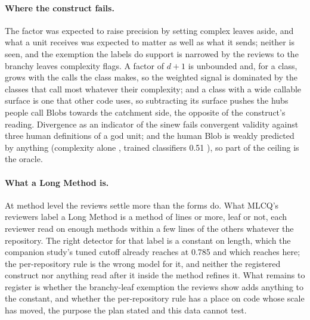 \documentclass[11pt,a4paper]{article}
\begin{document}
\paragraph{Where the construct fails.} The factor was expected to raise
precision by setting complex leaves aside, and what a unit receives was
expected to matter as well as what it sends; neither is seen, and the
exemption the labels do support is narrowed by the reviews to the branchy
leaves complexity flags. A factor of $d + 1$ is unbounded and, for a class,
grows with the calls the class makes, so the weighted signal is dominated
by the classes that call most whatever their complexity; and a class with
a wide callable surface is one that other code uses, so subtracting its
surface pushes the hubs people call Blobs towards the catchment side, the
opposite of the construct's reading. Divergence as an indicator of the sinew fails
convergent validity \cite{tempero2026metrics} against three human
definitions of a god unit; and the human Blob is weakly predicted by
anything (complexity alone \primXMcc{}, trained classifiers 0.51
\cite{mlcq2023}), so part of the ceiling is the oracle.

\paragraph{What a Long Method is.} At method level the reviews settle more
than the forms do. What MLCQ's reviewers label a Long Method is a method of
\lwLengthCutoff{} lines or more, leaf or not, each reviewer read on enough
methods within a few lines of the others whatever the repository. The right
detector for that label is a constant on length, which the companion
study's tuned cutoff already reaches at 0.785 \cite{paperone} and which
reaches \lwLengthMccConfirm{} here; the per-repository rule is the wrong
model for it, and neither the registered construct nor anything read after
it inside the method refines it. What remains to register is whether the
branchy-leaf exemption the reviews show adds anything to the constant, and
whether the per-repository rule has a place on code whose scale has moved,
the purpose the plan stated and this data cannot test.
\end{document}
